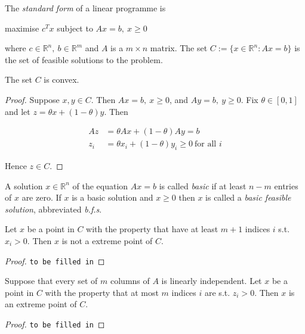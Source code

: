 \documentclass[a4paper]{article}
\begin{document}
\begin{definition}
  The \emph{standard form} of a linear programme is

  \begin{center}
    maximise $c^T x$ subject to $Ax = b,\: x\geq 0$
  \end{center}
  where $c \in \mathbb{R}^n,\: b \in \mathbb{R}^m$ and $A$ is a $m \times n$ matrix. The set $C := \{x \in \mathbb{R}^n: Ax = b\}$ is the set of feasible solutions to the problem.
\end{definition}

\begin{proposition}
  The set $C$ is convex.
\end{proposition}

\begin{proof}
  Suppose $x, y \in C$. Then $Ax = b,\: x \geq 0$, and $Ay = b,\: y \geq 0$. Fix $\theta \in [0, 1]$ and let $z = \theta x + (1 - \theta)y$. Then

  \begin{align*}
    Az &= \theta Ax + (1 - \theta) Ay = b \\
    z_i &= \theta x_i + (1 - \theta) y_i \geq 0 \: \text{for all } i
  \end{align*}

  Hence $z \in C$.
\end{proof}

A solution $x \in \mathbb{R}^n$ of the equation $Ax = b$ is called \emph{basic} if at least $n - m$ entries of $x$ are zero. If $x$ is a basic solution and $x \geq 0$ then $x$ is called a \emph{basic feasible solution}, abbreviated \emph{b.f.s}.

\begin{theorem}
  Let $x$ be a point in $C$ with the property that have at least $m+1$ indices $i$ s.t. $x_i>0$. Then $x$ is not a extreme point of $C$.
\end{theorem}

\begin{proof}
  \texttt{to be filled in}
\end{proof}

\begin{theorem}
  Suppose that every set of $m$ columns of $A$ is linearly independent. Let $x$ be a point in $C$ with the property that at most $m$ indices $i$ are s.t. $z_i>0$. Then $x$ is an extreme point of $C$.
\end{theorem}

\begin{proof}
  \texttt{to be filled in}
\end{proof}
\end{document}
